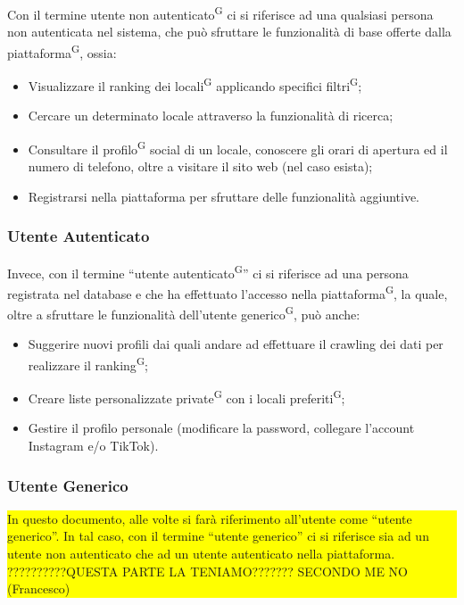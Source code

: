 Con il termine utente non autenticato\textsuperscript{G} ci si riferisce ad una qualsiasi persona non autenticata nel sistema, che può sfruttare le funzionalità di base offerte dalla piattaforma\textsuperscript{G}, ossia:

\begin{itemize}
  \item Visualizzare il ranking dei locali\textsuperscript{G} applicando specifici filtri\textsuperscript{G};
  \item Cercare un determinato locale attraverso la funzionalità di ricerca;
  \item Consultare il profilo\textsuperscript{G} social di un locale, conoscere gli orari di apertura ed il numero di telefono, oltre a visitare il sito web (nel caso esista);
  \item Registrarsi nella piattaforma per sfruttare delle funzionalità aggiuntive.
\end{itemize}

\subsubsection{Utente Autenticato}

Invece, con il termine “utente autenticato\textsuperscript{G}” ci si riferisce ad una persona registrata nel database e che ha effettuato l'accesso nella piattaforma\textsuperscript{G}, la quale, oltre a sfruttare le funzionalità dell’utente generico\textsuperscript{G}, può anche:

\begin{itemize}
  \item Suggerire nuovi profili dai quali andare ad effettuare il crawling dei dati per realizzare il ranking\textsuperscript{G};
  \item Creare liste personalizzate private\textsuperscript{G} con i locali preferiti\textsuperscript{G};
  \item Gestire il profilo personale (modificare la password, collegare l'account Instagram e/o TikTok).
\end{itemize}

\subsubsection{Utente Generico}

\colorbox{yellow}{\parbox{0.99\textwidth}{In questo documento, alle volte si farà riferimento all'utente come “utente generico”. In tal caso, con il termine “utente generico” ci si riferisce sia ad un utente non autenticato che ad un utente autenticato nella piattaforma. ??????????QUESTA PARTE LA TENIAMO??????? SECONDO ME NO (Francesco)}}

